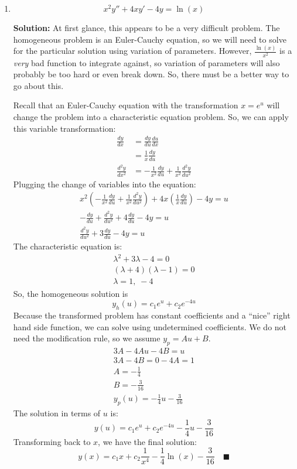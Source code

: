 \documentclass[letterpaper, fontsize=10pt]{scrartcl} %
\numberwithin{equation}{section} %
\numberwithin{figure}{section} %
\numberwithin{table}{section} %
\begin{document}
\begin{enumerate}
\begin{enumerate}[label=(\alph*)]
\item \[ x^2 y'' + 4x y' -4y = \ln(x) \]
\par \textbf{Solution:} At first glance, this appears to be a very difficult problem. The homogeneous problem is an Euler-Cauchy equation, so we will need to solve for the particular solution using variation of parameters. However, $\frac{\ln(x)}{x^2}$ is a \textit{very} bad function to integrate against, so variation of parameters will also probably be too hard or even break down. So, there must be a better way to go about this. 
\par Recall that an Euler-Cauchy equation with the transformation $x = e^u$ will change the problem into a characteristic equation problem. So, we can apply this variable transformation:
\begin{align*}
\frac{dy}{dx} &= \frac{dy}{du}\frac{du}{dx} \\
&= \frac{1}{x} \frac{dy}{du}\\
\frac{d^2y}{dx^2} &= -\frac{1}{x^2}\frac{dy}{du} + \frac{1}{x^2}\frac{d^2y}{du^2}
\end{align*}
Plugging the change of variables into the equation:
\begin{gather*}
x^2 \left( -\frac{1}{x^2}\frac{dy}{du} + \frac{1}{x^2}\frac{d^2y}{du^2} \right) + 4x \left(\frac{1}{x} \frac{dy}{du} \right) -4y = u \\ 
-\frac{dy}{du} + \frac{d^2y}{du^2} + 4 \frac{dy}{du}  -4y = u \\ 
\frac{d^2y}{du^2} + 3 \frac{dy}{du}  -4y = u 
\end{gather*}
The characteristic equation is:
\begin{gather*}
\lambda^2 + 3\lambda - 4 = 0\\
(\lambda +4)(\lambda - 1) = 0\\
\lambda = 1, \; -4
\end{gather*}
So, the homogeneous solution is
\[ y_h(u) = c_1 e^u +c_2 e^{-4u} \]
Because the transformed problem has constant coefficients and a ``nice'' right hand side function, we can solve using undetermined coefficients. We do not need the modification rule, so we assume $y_p = Au + B$. 
\begin{gather*}
 3 A -4Au - 4B = u  \\
 3A - 4B = 0
 -4A = 1\\
 A = -\frac{1}{4}\\
 B = -\frac{3}{16}\\
 y_p(u) = -\frac{1}{4}u -\frac{3}{16}
\end{gather*}
The solution in terms of $u$ is:
\[y(u) = c_1 e^u +c_2 e^{-4u}-\frac{1}{4}u -\frac{3}{16} \]
Transforming back to $x$, we have the final solution:
\[ y(x) = c_1 x + c_2 \frac{1}{x^4} - \frac{1}{4}\ln(x) - \frac{3}{16}\quad\blacksquare \]


\end{enumerate}
\end{enumerate}
\end{document}
